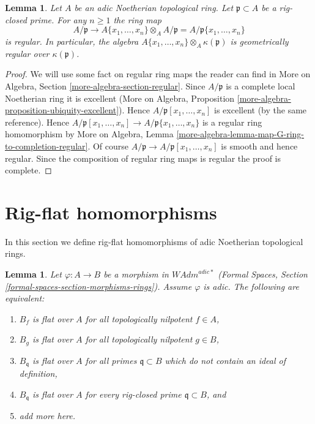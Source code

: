\documentclass{stacks-project}
\theoremstyle{plain}
\newtheorem{lemma}[subsection]{Lemma}
\theoremstyle{definition}
\theoremstyle{remark}
\numberwithin{equation}{subsection}
\begin{document}
\begin{lemma}
\label{lemma-fibre-regular}
Let $A$ be an adic Noetherian topological ring.
Let $\mathfrak p \subset A$ be a rig-closed prime.
For any $n \geq 1$ the ring map
$$
A/\mathfrak p
\longrightarrow
A\{x_1, \ldots, x_n\} \otimes_A A/\mathfrak p =
A/\mathfrak p\{x_1, \ldots, x_n\}
$$
is regular. In particular, the algebra
$A\{x_1, \ldots, x_n\} \otimes_A \kappa(\mathfrak p)$
is geometrically regular over $\kappa(\mathfrak p)$.
\end{lemma}

\begin{proof}
We will use some fact on regular ring maps the reader can find
in More on Algebra, Section \ref{more-algebra-section-regular}.
Since $A/\mathfrak p$ is a complete local Noetherian ring it
is excellent (More on Algebra, Proposition
\ref{more-algebra-proposition-ubiquity-excellent}).
Hence $A/\mathfrak p[x_1, \ldots, x_n]$ is excellent
(by the same reference). Hence
$A/\mathfrak p[x_1, \ldots, x_n] \to A/\mathfrak p\{x_1, \ldots, x_n\}$
is a regular ring homomorphism by
More on Algebra, Lemma
\ref{more-algebra-lemma-map-G-ring-to-completion-regular}.
Of course $A/\mathfrak p \to A/\mathfrak p[x_1, \ldots, x_n]$
is smooth and hence regular. Since the composition of regular
ring maps is regular the proof is complete.
\end{proof}







\section{Rig-flat homomorphisms}
\label{section-rig-flat-homomorphisms}

\noindent
In this section we define rig-flat homomorphisms of adic Noetherian
topological rings.

\begin{lemma}
\label{lemma-naively-rig-flat-continuous}
Let $\varphi : A \to B$ be a morphism in $\textit{WAdm}^{adic*}$
(Formal Spaces, Section \ref{formal-spaces-section-morphisms-rings}).
Assume $\varphi$ is adic. The following are equivalent:
\begin{enumerate}
\item $B_f$ is flat over $A$ for all
topologically nilpotent $f \in A$,
\item $B_g$ is flat over $A$ for all
topologically nilpotent $g \in B$,
\item $B_\mathfrak q$ is flat over $A$
for all primes $\mathfrak q \subset B$ which do not contain
an ideal of definition,
\item $B_\mathfrak q$ is flat over $A$ for every rig-closed
prime $\mathfrak q \subset B$, and
\item add more here.
\end{enumerate}
\end{lemma}
\end{document}
